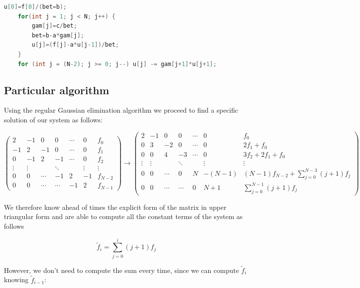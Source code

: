 \documentclass {article}
\begin{document}
\begin{lstlisting}[language=cpp]
	u[0]=f[0]/(bet=b);
    for(int j = 1; j < N; j++) {
        gam[j]=c/bet;
        bet=b-a*gam[j];
        u[j]=(f[j]-a*u[j-1])/bet;
    }
    for (int j = (N-2); j >= 0; j--) u[j] -= gam[j+1]*u[j+1];
\end{lstlisting}
\subsection{Particular algorithm}

Using the regular Gaussian elimination algorithm we proceed to find a specific solution of our system as follows:

\begin{equation}
\left(
\begin{array}{cccccc|c}
   2 & -1 &  0 & 0 & \cdots & 0 & f_0 \\
  -1 &  2 & -1 & 0 & \cdots & 0 & f_1 \\
   0 &-1 &  2 & -1 & \cdots & 0 & f_2\\
  \vdots  & \vdots  & & \ddots & & \vdots & \vdots  \\
   0 &  0 & \cdots  & -1 & 2 & -1 & f_{N-2} \\
   0 &  0 & \cdots & \cdots  & -1 & 2 & f_{N-1} 
\end{array}	
\right)
\longrightarrow
\left(
\begin{array}{cccccc|c}
   2 & -1 &  0 & 0 & \cdots & 0 & f_0 \\
   0 &  3 & -2 & 0 & \cdots & 0 & 2 f_1+f_0 \\
   0 & 0 &  4 & -3 & \cdots & 0 & 3 f_2+2 f_1+f_0\\
  \vdots  & \vdots  & & \ddots & & \vdots & \vdots  \\
   0 &  0 & \cdots  & 0 & N & -(N-1) &  (N-1) f_{N-2} + \sum_{j=0}^{N-3} (j+1)f_{j}  \\
   0 &  0 & \cdots & \cdots  & 0 & N+1 &  \sum_{j=0}^{N-1} (j+1)f_{j} 
\end{array}	
\right)
\end{equation}

We therefore know ahead of times the explicit form of the matrix in upper triangular form and are able to compute all the constant terms of the system as follows

$$\tilde{f}_i= \sum_{j=0}^{i}(j+1) f_j$$

However, we don't need to compute the sum every time, since we can compute $\tilde{f}_i$ knowing $\tilde{f}_{i-1}$:
\end{document}
